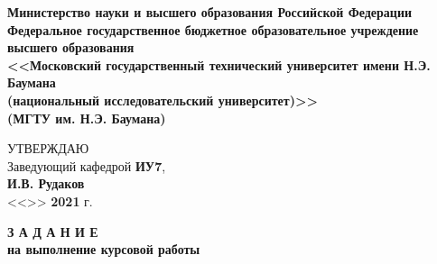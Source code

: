 \thispagestyle{empty}
\begin{center}
    \fontsize{12pt}{0.3\baselineskip}\selectfont \textbf{Министерство науки и высшего образования Российской Федерации \\ Федеральное государственное бюджетное образовательное учреждение \\ высшего образования \\ <<Московский государственный технический университет имени Н.Э. Баумана \\ (национальный исследовательский университет)>> \\ (МГТУ им. Н.Э. Баумана)}

    \fontsize{11pt}{0.3\baselineskip}\selectfont
    \noindent \makebox[\linewidth]{\rule{\textwidth}{4pt}} \makebox[\linewidth]{\rule{\textwidth}{1pt}}
\end{center}
\begin{flushright}
    \fontsize{11pt}{0.5\baselineskip}\selectfont УТВЕРЖДАЮ \\ Заведующий кафедрой \textbf{ИУ7}, \\ \textbf{\hspace*{2.5cm}} \uline{\hspace*{2cm}} \textbf{И.В. Рудаков} \\ <<\uline{\hspace*{1cm}}>> \uline{\hspace*{2.5cm}} \textbf{2021} г.
\end{flushright}

\vfill

\begin{center}
    \fontsize{18pt}{0.7\baselineskip}\selectfont \textbf{З А Д А Н И Е}\\
    \fontsize{16pt}{\baselineskip}\selectfont \textbf{на выполнение курсовой работы}
\end{center}

